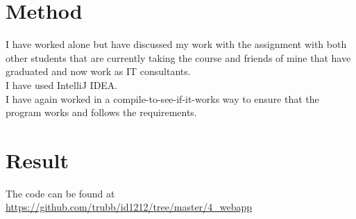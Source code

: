 \documentclass[a4paper]{scrartcl}
\begin{document}
\section{Method}

I have worked alone but have discussed my work with the assignment with both other students that are currently taking the course and friends of mine that have graduated and now work as IT consultants.\\
I have used IntelliJ IDEA.\\
I have again worked in a compile-to-see-if-it-works way to ensure that the program works and follows the requirements.


\section{Result}

The code can be found at\\
\url{https://github.com/trubb/id1212/tree/master/4_webapp}
\end{document}
